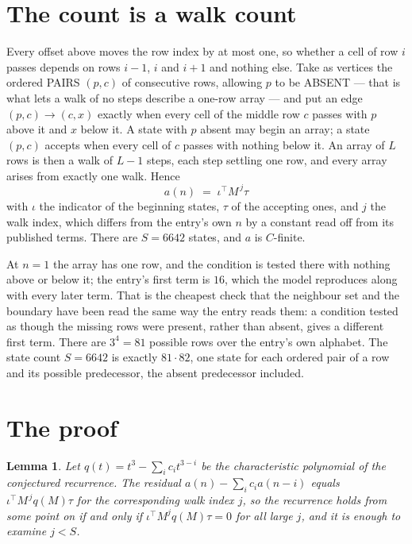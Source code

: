\documentclass[11pt,a4paper]{article}
\theoremstyle{plain}
\newtheorem{lemma}[theorem]{Lemma}
\theoremstyle{definition}
\begin{document}
\section{The count is a walk count}

Every offset above moves the row index by at most one, so whether a cell of row $i$ passes
depends on rows $i-1$, $i$ and $i+1$ and nothing else. Take as vertices the ordered PAIRS
$(p,c)$ of consecutive rows, allowing $p$ to be ABSENT --- that is what lets a walk of no steps
describe a one-row array --- and put an edge $(p,c)\to(c,x)$ exactly when every cell of the
middle row $c$ passes with $p$ above it and $x$ below it. A state with $p$ absent may begin an
array; a state $(p,c)$ accepts when every cell of $c$ passes with nothing below it. An array of
$L$ rows is then a walk of $L-1$ steps, each step settling one row, and every array arises from
exactly one walk. Hence
\[
a(n)\;=\;\iota^{\!\top}M^{\,j}\tau
\]
with $\iota$ the indicator of the beginning states, $\tau$ of the accepting ones, and $j$ the
walk index, which differs from the entry's own $n$ by a constant read off from its published
terms. There are $S=6642$ states, and $a$ is $C$-finite.

At $n=1$ the array has one row, and
the condition is tested there with nothing above or below it; the entry's first term is
$16$, which the model reproduces along with every later term. That is the cheapest check
that the neighbour set and the boundary have been read the same way the entry reads them: a
condition tested as though the missing rows were present, rather than absent, gives a different
first term. There are $3^{4}=81$ possible rows over the entry's own alphabet. The state count $S=6642$ is exactly $81\cdot82$,
one state for each ordered pair of a row and its possible predecessor, the absent predecessor
included.

\section{The proof}

\begin{lemma}\label{lem:crit}
Let $q(t)=t^{3}-\sum_i c_it^{3-i}$ be the characteristic polynomial of the
conjectured recurrence. The residual $a(n)-\sum_ic_ia(n-i)$ equals
$\iota^{\!\top}M^{\,j}q(M)\tau$ for the corresponding walk index $j$, so the recurrence
holds from some point on if and only if $\iota^{\!\top}M^{j}q(M)\tau=0$ for all large $j$,
and it is enough to examine $j<S$.
\end{lemma}
\end{document}
